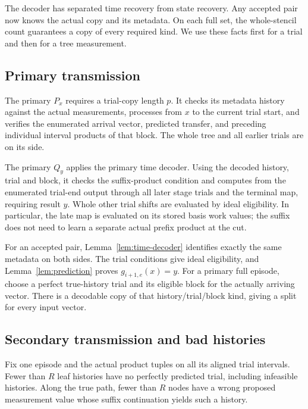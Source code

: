The decoder has separated time recovery from state recovery. Any accepted
pair now knows the actual copy and its metadata. On each full set, the
whole-stencil count guarantees a copy of every required kind. We use
these facts first for a trial and then for a tree measurement.

\subsection{Primary transmission}

The primary \(P_x\) requires a trial-copy length \(p\). It checks its metadata
history against the actual measurements, processes from \(x\) to the current
trial start, and verifies the enumerated arrival vector, predicted transfer,
and preceding individual interval products of that block.
The whole tree and all earlier trials are on its side.

The primary \(Q_y\) applies the primary time decoder. Using the decoded
history, trial and block, it checks the suffix-product condition and computes
from the enumerated trial-end output through all later stage trials and the
terminal map, requiring result \(y\). Whole other trial shifts are evaluated
by ideal eligibility. In particular, the late map is evaluated on its stored
basis work values; the suffix does not need to learn a separate actual prefix
product at the cut.

For an accepted pair, Lemma~\ref{lem:time-decoder} identifies exactly the same
metadata on both sides. The trial conditions give ideal eligibility, and
Lemma~\ref{lem:prediction} proves \(g_{i+1,e}(x)=y\).
For a primary full episode, choose a perfect true-history trial and its
eligible block for the actually arriving vector. There is a decodable copy
of that history/trial/block kind, giving a split for every input vector.

\subsection{Secondary transmission and bad histories}

\begin{lemma}\label{lem:bad-histories}
Fix one episode and the actual product tuples on all its aligned trial
intervals. Fewer than \(R\) leaf histories have no perfectly predicted trial,
including infeasible histories. Along the true path, fewer than \(R\) nodes
have a wrong proposed measurement value whose suffix continuation yields
such a history.
\end{lemma}

